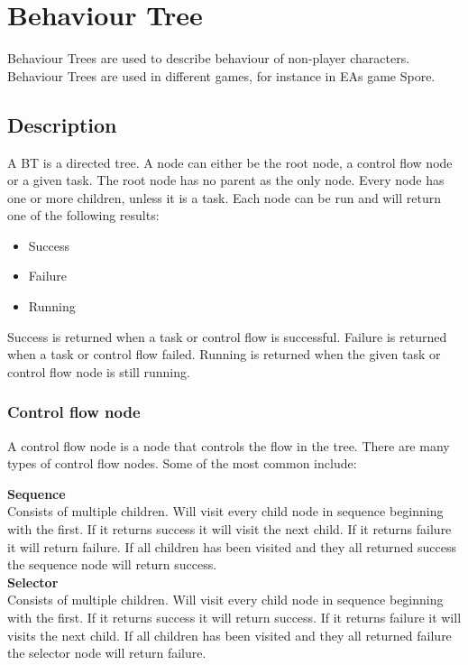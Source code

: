
\section{Behaviour Tree}
Behaviour Trees are used to describe behaviour of non-player characters. Behaviour Trees are used in different games, for instance in EAs game Spore\cite{spore}.

\subsection{Description}
A BT is a directed tree. A node can either be the root node, a control flow node or a given task. The root node has no parent as the only node. Every node has one or more children, unless it is a task. Each node can be run and will return one of the following results:

\begin{itemize}
	\item Success
	\item Failure
	\item Running
\end{itemize} 

Success is returned when a task or control flow is successful. Failure is returned when a task or control flow failed. Running is returned when the given task or control flow node is still running.

\subsubsection{Control flow node}
A control flow node is a node that controls the flow in the tree. There are many types of control flow nodes. Some of the most common include: \\

\newcommand{\nodeHeading}[1]{\noindent \textbf{#1}\\}

\nodeHeading{Sequence}
Consists of multiple children. Will visit every child node in sequence beginning with the first. If it returns success it will visit the next child. If it returns failure it will return failure. If all children has been visited and they all returned success the sequence node will return success. \\

\nodeHeading{Selector}
Consists of multiple children. Will visit every child node in sequence beginning with the first. If it returns success it will return success. If it returns failure it will visits the next child. If all children has been visited and they all returned failure the selector node will return failure. \\

